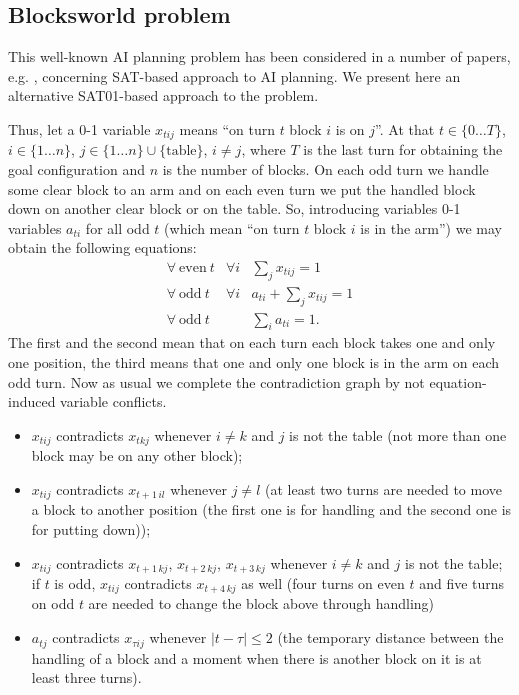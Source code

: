 \documentclass[11pt]{article}
\begin{document}
\subsection{Blocksworld problem}
This well-known AI planning problem has been considered in a number of papers, e.g. \cite{KS92,KS96,KS98}, concerning SAT-based approach to AI planning. We present here an alternative SAT01-based approach to the problem.

Thus, let a 0-1 variable $x_{tij}$ means ``on turn $t$ block $i$ is on $j$''. At that $t \in \{0 \ldots T\}$, $i \in \{1 \ldots n\}$, $j \in \{1 \ldots n\} \cup \{\textrm{table}\}$, $i \ne j$, where $T$ is the last turn for obtaining the goal configuration and $n$ is the number of blocks. On each odd turn we handle some clear block to an arm and on each even turn we put the handled block down on another clear block or on the table. So, introducing variables 0-1 variables $a_{ti}$ for all odd $t$ (which mean ``on turn $t$ block $i$ is in the arm'') we may obtain the following equations:
\begin{equation}
\label{eq:bwp2sat01}
\begin{array}{lcr}
\forall \ \textrm{even} \ t & \forall i & \displaystyle\sum_j x_{tij} =1 \\
\forall \ \textrm{odd} \ t & \forall i & a_{ti}+\displaystyle\sum_j x_{tij} =1 \\
\forall \ \textrm{odd} \ t & & \displaystyle\sum_i a_{ti} =1.
\end{array}
\end{equation}
The first and the second mean that on each turn each block takes one and only one position, the third means that one and only one block is in the arm on each odd turn. Now as usual we complete the contradiction graph by not equation-induced variable conflicts.
\begin{itemize}
\item $x_{tij}$ contradicts $x_{tkj}$ whenever $i \ne k$ and $j$ is not the table (not more than one block may be on any other block);
\item $x_{tij}$ contradicts $x_{t+1\,il}$ whenever $j \ne l$ (at least two turns are needed to move a block to another position (the first one is for handling and the second one is for putting down));
\item $x_{tij}$ contradicts $x_{t+1\,kj}$, $x_{t+2\,kj}$, $x_{t+3\,kj}$ whenever $i \ne k$ and $j$ is not the table; if $t$ is odd, $x_{tij}$ contradicts $x_{t+4\,kj}$ as well (four turns on even $t$ and five turns on odd $t$ are needed to change the block above through handling)
\item $a_{tj}$ contradicts $x_{\tau ij}$ whenever $|t-\tau| \le 2$ (the temporary distance between the handling of a block and a moment when there is another block on it is at least three turns).
\end{itemize}
\end{document}
